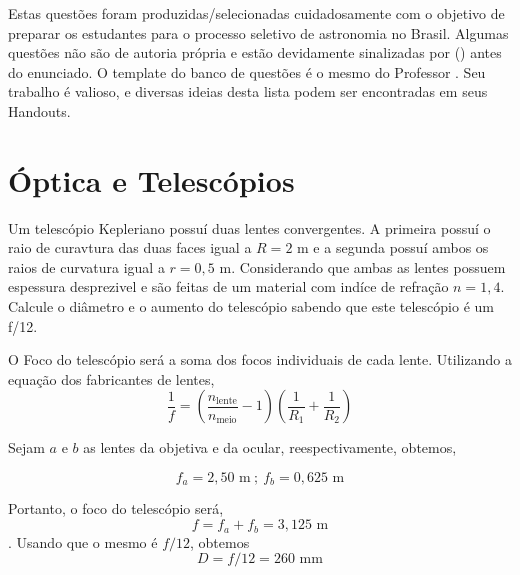 \documentclass[11pt]{article}
\begin{document}

Estas questões foram produzidas/selecionadas cuidadosamente com o objetivo de preparar os estudantes para o processo seletivo de astronomia no Brasil. Algumas questões não são de autoria própria e estão devidamente sinalizadas por () antes do enunciado. O template do banco de questões é o mesmo do Professor . Seu trabalho é valioso, e diversas ideias desta lista podem ser encontradas em seus Handouts.




\section{Óptica e Telescópios}

    \begin{pproblem} Um telescópio Kepleriano possuí duas lentes convergentes. A primeira possuí o raio de curavtura das duas faces igual a \(R = 2\text{ m}\) e a segunda possuí ambos os raios de curvatura igual a \(r = 0,5 \text{ m}\). Considerando que ambas as lentes possuem espessura desprezivel e são feitas de um material com indíce de refração \(n=1,4\). Calcule o diâmetro e o aumento do telescópio sabendo que este telescópio é um f/12.
    \begin{pssolution*}{}{}
        O Foco do telescópio será a soma dos focos individuais de cada lente. Utilizando a equação dos fabricantes de lentes, 
        \[\frac{1}{f} = \left(\frac{n_{\text{lente}}}{n_{\text{meio}}}-1\right)\left(\frac{1}{R_1}+\frac{1}{R_2}\right)\]

        Sejam \(a\) e \(b\) as lentes da objetiva e da ocular, reespectivamente, obtemos, 
        
        \[f_a = 2,50 \text{ m}\ ; \ f_b = 0,625\text{ m}\]

        Portanto, o foco do telescópio será, \[f = f_a+f_b = 3,125\text{ m}\]. Usando que o mesmo é \(f/12\), obtemos
        \[\boxed{D = f/12 = 260 \text{ mm}}\]
    \end{pssolution*}
    \end{pproblem}
\end{document}
